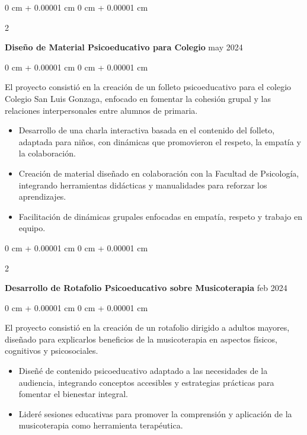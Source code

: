 \documentclass[10pt, letterpaper]{article}
\newenvironment{highlights}{
    \begin{itemize}[
        topsep=0.10 cm,
        parsep=0.10 cm,
        partopsep=0pt,
        itemsep=0pt,
        leftmargin=0 cm + 10pt
    ]
}{
    \end{itemize}
} %
\newenvironment{onecolentry}{
    \begin{adjustwidth}{
        0 cm + 0.00001 cm
    }{
        0 cm + 0.00001 cm
    }
}{
    \end{adjustwidth}
} %
\newenvironment{twocolentry}[2][]{
    \onecolentry
    \def\secondColumn{#2}
    \setcolumnwidth{\fill, 4.5 cm}
    \begin{paracol}{2}
}{
    \switchcolumn \raggedleft \secondColumn
    \end{paracol}
    \endonecolentry
} %
\begin{document}
        \vspace{0.2 cm}

        \begin{twocolentry}{
            may 2024
        }
            \textbf{Diseño de Material Psicoeducativo para Colegio}\end{twocolentry}

        \vspace{0.10 cm}
        \begin{onecolentry}
        El proyecto consistió en la creación de un folleto psicoeducativo para el colegio Colegio San Luis Gonzaga, enfocado en fomentar la cohesión grupal y las relaciones interpersonales entre alumnos de primaria.
            \begin{highlights}
                \item Desarrollo de una charla interactiva basada en el contenido del folleto, adaptada para niños, con dinámicas que promovieron el respeto, la empatía y la colaboración.
                \item Creación de material diseñado en colaboración con la Facultad de Psicología, integrando herramientas didácticas y manualidades para reforzar los aprendizajes.
                \item Facilitación de dinámicas grupales enfocadas en empatía, respeto y trabajo en equipo.
            \end{highlights}
        \end{onecolentry}

        \vspace{0.2 cm}

        \begin{twocolentry}{
            feb 2024
        }
            \textbf{Desarrollo de Rotafolio Psicoeducativo sobre Musicoterapia}\end{twocolentry}

        \vspace{0.10 cm}
        \begin{onecolentry}
        El proyecto consistió en la creación de un rotafolio dirigido a adultos mayores, diseñado para explicarlos beneficios de la musicoterapia en aspectos físicos, cognitivos y psicosociales.
            \begin{highlights}
                \item Diseñé de contenido psicoeducativo adaptado a las necesidades de la audiencia, integrando conceptos accesibles y estrategias prácticas para fomentar el bienestar integral.
                \item Lideré sesiones educativas para promover la comprensión y aplicación de la musicoterapia como herramienta terapéutica.
            \end{highlights}
        \end{onecolentry}
        
\end{document}
